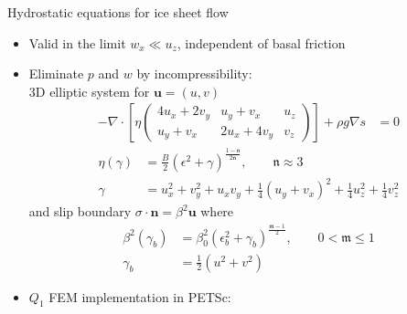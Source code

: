 \begin{frame}{Hydrostatic equations for ice sheet flow}
  \begin{itemize}
  \item Valid in the limit $w_x \ll u_z$, independent of basal friction
  \item Eliminate $p$ and $w$ by incompressibility:\\
    \quad 3D elliptic system for $\bm u = (u,v)$
    \begin{align*}
      - \nabla\cdot \left[ \eta
        \begin{pmatrix}
          4 u_x + 2 v_y & u_y + v_x & u_z \\
          u_y + v_x & 2 u_x + 4 v_y & v_z
        \end{pmatrix} \right] + \rho g \nabla s & = 0
    \end{align*}
    \begin{align*}
      \eta(\gamma) &= \frac B 2 (\epsilon^2 + \gamma)^{\frac{1-\mathfrak n}{2\mathfrak n}}, \qquad \mathfrak n \approx 3 \\
      \gamma &= u_x^2 + v_y^2 + u_xv_y + \frac 1 4 (u_y+v_x)^2 + \frac 1 4 u_z^2 + \frac 1 4 v_z^2
    \end{align*}
    and slip boundary $\sigma \cdot \bm n = \beta^2 \bm u$ where
    \begin{align*}
      \beta^2(\gamma_b) &= \beta_0^2 (\epsilon_b^2 + \gamma_b)^{\frac{\mathfrak m-1}{2}}, \qquad 0 < \mathfrak m \le 1 \\
      \gamma_b &= \frac 1 2 (u^2 + v^2)
    \end{align*}
  \item $Q_1$ FEM implementation in PETSc: 
  \end{itemize}
\end{frame}
